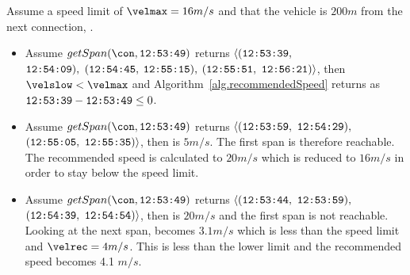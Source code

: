Assume a speed limit of $\velmax = 16 m/s$ and that the vehicle is $200 m$ from the next connection, \con.
\vspace{-4mm}
\begin{itemize}
\item Assume $getSpan(\con, \verb#12:53:49#)$ returns $\langle(\verb#12:53:39#,$\\$\verb#12:54:09#),$ $(\verb#12:54:45#,$ $\verb#12:55:15#),$ $(\verb#12:55:51#,$ $\verb#12:56:21#)\rangle$, then $\velslow < \velmax$ and Algorithm~\ref{alg.recommendedSpeed} returns \velmax as $\verb#12:53:39#-\verb#12:53:49# \leq 0$.

\item Assume $getSpan(\con, \verb#12:53:49#)$ returns $\langle(\verb#12:53:59#,$ $\verb#12:54:29#),$ $(\verb#12:55:05#,$ $\verb#12:55:35#)\rangle$, then \velslow is $5 m/s$.
The first span is therefore reachable. 
The recommended speed is calculated to $20m/s$ which is reduced to $16 m/s$ in order to stay below the speed limit.

\item Assume $getSpan(\con, \verb#12:53:49#)$ returns $\langle(\verb#12:53:44#,$ $\verb#12:53:59#),$ $(\verb#12:54:39#,$ $\verb#12:54:54#)\rangle$, then \velslow is $20 m/s$ and the first span is not reachable.
Looking at the next span, \velslow becomes $3.1m/s$ which is less than the speed limit and $\velrec = 4 m/s$. 
This is less than the lower limit and the recommended speed becomes 4.1 $m/s$.
\end{itemize}

